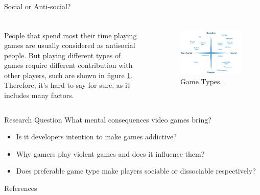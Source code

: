 \documentclass{beamer}
\begin{document}
\begin{frame}{Social or Anti-social?}
	\frametitle{}
	\begin{columns}
		People that spend most their time playing games are usually considered as antisocial people. But playing different types of games require different contribution with other players, such are shown in figure \ref{fig:gtypes}. Therefore, it's hard to say for sure, as it includes many factors.
		\frametitle{}
		\begin{figure}
			\includegraphics[width=\linewidth]{all-video-game-genres-2}
			\caption{Game Types.}
			\label{fig:gtypes}
		\end{figure}
	\end{columns}
\end{frame}

\begin{frame}{Research Question}
	What mental consequences video games bring? \vspace{5mm}
	\begin{itemize}
		\item Is it developers intention to make games addictive?
		\item Why gamers play violent games and does it influence them?
		\item Does preferable game type make players sociable or dissociable respectively?
	\end{itemize}
\end{frame}

\begin{frame}[allowframebreaks]{References}
	
	
\end{frame}
\end{document}
